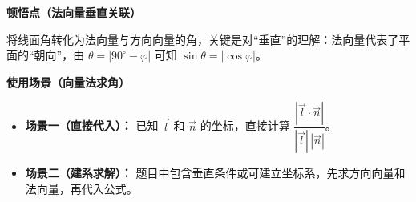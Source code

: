 \begin{explanationbox}
	\medskip

	\textbf{\textcolor{CExplanation}{顿悟点（法向量垂直关联）}}

	将线面角转化为法向量与方向向量的角，关键是对“垂直”的理解：法向量代表了平面的“朝向”，由 $\theta = |90^\circ - \varphi|$ 可知 $\sin\theta = |\cos\varphi|$。

	\medskip

	\textbf{\textcolor{CExplanation}{使用场景（向量法求角）}}

	\begin{itemize}[leftmargin=*, itemsep=0.5em, topsep=0.4em]
		\item \textbf{场景一（直接代入）：} 已知 $\vec{l}$ 和 $\vec{n}$ 的坐标，直接计算 $\dfrac{|\vec{l}\cdot\vec{n}|}{|\vec{l}|\,|\vec{n}|}$。
		\item \textbf{场景二（建系求解）：} 题目中包含垂直条件或可建立坐标系，先求方向向量和法向量，再代入公式。
	\end{itemize}

\end{explanationbox}